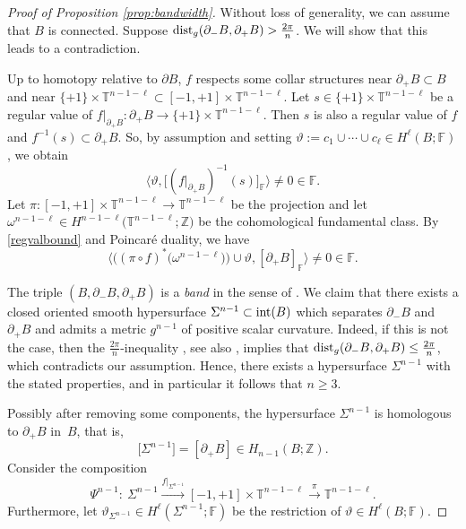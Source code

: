 \documentclass[pdftex]{sigma}
\numberwithin{equation}{section}
\newcommand{\F}{\mathbb{F}}
\newcommand{\Z}{\mathbb{Z}}
\newcommand{\TTT}{\mathbb{T}}
\begin{document}
\begin{proof}[Proof of Proposition \ref{prop:bandwidth}]
Without loss of generality, we can assume that $B$ is connected.
Suppose ${\rm dist}_g(\partial_- B , \partial_+B) > \frac{2\pi}{n}$.
We will show that this leads to a contradiction.


Up to homotopy relative to $\partial B$, $f$ respects some collar structures near $\partial_+ B \subset B$ and near $\{+1\} \times {\TTT}^{n-1-\ell} \subset [-1 , +1] \times {\TTT}^{n-1-\ell}$.
Let $s \in \{ +1\} \times {\TTT}^{n-1-\ell}$ be a regular value of $f|_{\partial_+ B} \colon \partial_+ B \to \{ +1\} \times {\TTT}^{n-1-\ell}$.
Then $s$ is also a regular value of $f$ and $f^{-1}(s) \subset \partial_+ B$.
So, by assumption and setting $\vartheta := c_1 \cup \cdots \cup c_{\ell} \in H^{\ell} (B; \F)$, we obtain
\begin{equation} \label{regvalbound}
 \big\langle \vartheta , \big[ ( f|_{\partial_+ B})^{-1} (s)\big]_\F \big\rangle \neq 0 \in \F.
\end{equation}
Let $\pi \colon [-1, +1] \times {\TTT}^{n-1-\ell} \to {\TTT}^{n-1-\ell}$ be the projection and let
$
 \omega^{n-1-\ell} \in H^{n-1-\ell}\big( {\TTT}^{n-1-\ell} ; \Z\big)
$
 be the cohomological fundamental class.
By \eqref{regvalbound} and Poincar\'e duality, we have
\begin{equation} \label{boundary}
 \big\langle \big( (\pi \circ f)^* \big(\omega^{n-1-\ell}\big) \big) \cup \vartheta , [ \partial_+ B]_\F \big\rangle \neq 0 \in \F.
\end{equation}

The triple $(B, \partial_- B, \partial_+ B)$ is a {\em band} in the sense of \cite[Definition 1.1]{Raede22}.
We claim that there exists a closed oriented smooth hypersurface $\Sigma^{n-1} \subset {\rm int}(B)$ which separates $\partial_- B$ and~$\partial_{+}B$ and admits a metric $g^{n-1}$ of positive scalar curvature.
Indeed, if this is not the case, then the $\frac{2\pi}{n}$-in\-equality \cite[Theorem 2.8]{Raede22}, see also \cite[Sections 3.6, 3.7 and 5.2]{Gr21}, implies that ${\rm dist}_g(\partial_- B , \partial_+B) \leq \frac{2\pi}{n}$, which contradicts our assumption.
Hence, there exists a hypersurface $\Sigma^{n-1}$ with the stated properties, and in particular it follows that $n \geq 3$.

Possibly after removing some components, the hypersurface $\Sigma^{n-1}$ is homologous to $\partial_+ B$ in~$B$, that is,
\begin{equation} \label{homologies}
 \big[\Sigma^{n-1}\big] = [\partial_+ B] \in H_{n-1}(B; \Z).
\end{equation}
Consider the composition
\[
 \Psi^{n-1} \colon\ \Sigma^{n-1} \stackrel{f|_{\Sigma^{n-1}}}{\longrightarrow} [ -1, +1] \times {\TTT}^{n-1-\ell} \stackrel{\pi}{\longrightarrow} {\TTT}^{n -1-\ell}.
\]
Furthermore, let $ \vartheta_{\Sigma^{n-1}} \in H^{\ell}(\Sigma^{n-1}; \F)$ be the restriction of $\vartheta \in H^{\ell}(B; \F)$.


\end{proof}
\end{document}
